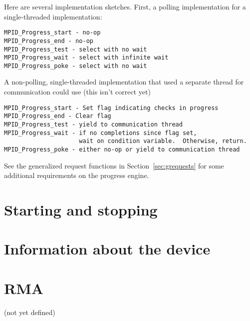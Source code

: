 \documentclass{article}
\begin{document}
Here are several implementation sketches.
First, a polling implementation for a single-threaded implementation:
\begin{verbatim}
MPID_Progress_start - no-op
MPID_Progress_end - no-op
MPID_Progress_test - select with no wait
MPID_Progress_wait - select with infinite wait
MPID_Progress_poke - select with no wait
\end{verbatim}

A non-polling, single-threaded implementation that used a separate
thread for communication could use (this isn't correct yet)
\begin{verbatim}
MPID_Progress_start - Set flag indicating checks in progress
MPID_Progress_end - Clear flag
MPID_Progress_test - yield to communication thread
MPID_Progress_wait - if no completions since flag set, 
                     wait on condition variable.  Otherwise, return.
MPID_Progress_poke - either no-op or yield to communication thread
\end{verbatim}

See the generalized request functions in Section~\ref{sec:grequests}
for some additional requirements on the progress engine.







\section{Starting and stopping}




\section{Information about the device}


\section{RMA}
(not yet defined)
%
%
%
%
%
%
%
%
%
\end{document}
